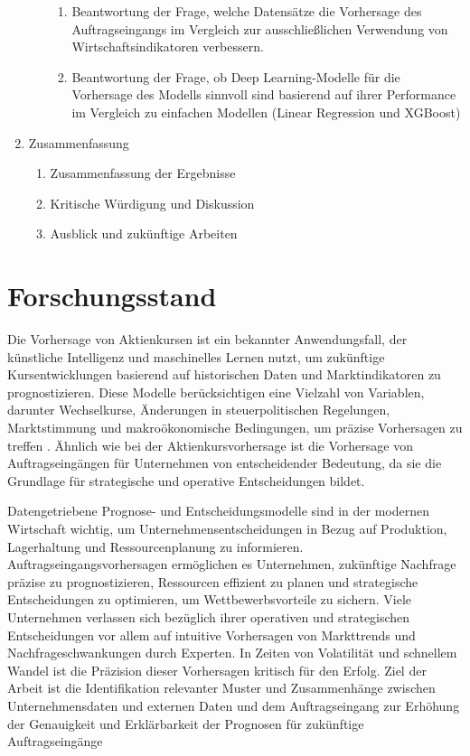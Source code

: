 \documentclass[lettersize,journal]{IEEEtran}
\begin{document}
\begin{enumerate}
\begin{enumerate}
\begin{enumerate}
      \item Beantwortung der Frage, welche Datensätze die Vorhersage des Auftragseingangs im Vergleich zur ausschließlichen Verwendung von Wirtschaftsindikatoren verbessern.
      \item Beantwortung der Frage, ob Deep Learning-Modelle für die Vorhersage des Modells sinnvoll sind basierend auf ihrer Performance im Vergleich zu einfachen Modellen (Linear Regression und XGBoost)
    \end{enumerate}
  \end{enumerate}
  \item Zusammenfassung
  \begin{enumerate}
    \item Zusammenfassung der Ergebnisse
    \item Kritische Würdigung und Diskussion
    \item Ausblick und zukünftige Arbeiten
  \end{enumerate}
\end{enumerate}



\section{Forschungsstand}
Die Vorhersage von Aktienkursen ist ein bekannter Anwendungsfall, der künstliche Intelligenz und maschinelles Lernen nutzt, um zukünftige Kursentwicklungen basierend auf historischen Daten und Marktindikatoren zu prognostizieren. Diese Modelle berücksichtigen eine Vielzahl von Variablen, darunter Wechselkurse, Änderungen in steuerpolitischen Regelungen, Marktstimmung und makroökonomische Bedingungen, um präzise Vorhersagen zu treffen \cite{mo2024backgroundawaremultisourcefusionfinancial}. Ähnlich wie bei der Aktienkursvorhersage ist die Vorhersage von Auftragseingängen für Unternehmen von entscheidender Bedeutung, da sie die Grundlage für strategische und operative Entscheidungen bildet.

Datengetriebene Prognose- und Entscheidungsmodelle sind in der modernen Wirtschaft wichtig, um Unternehmensentscheidungen in Bezug auf Produktion, Lagerhaltung und Ressourcenplanung zu informieren. Auftragseingangsvorhersagen ermöglichen es Unternehmen, zukünftige Nachfrage präzise zu prognostizieren, Ressourcen effizient zu planen und strategische Entscheidungen zu optimieren, um Wettbewerbsvorteile zu sichern. 
Viele Unternehmen verlassen sich bezüglich ihrer operativen und strategischen Entscheidungen vor allem auf intuitive Vorhersagen von Markttrends und Nachfrageschwankungen durch Experten. In Zeiten von Volatilität und schnellem Wandel ist die Präzision dieser Vorhersagen kritisch für den Erfolg.
Ziel der Arbeit ist die Identifikation relevanter Muster und Zusammenhänge zwischen Unternehmensdaten und externen Daten und dem Auftragseingang zur Erhöhung der Genauigkeit und Erklärbarkeit der Prognosen für zukünftige Auftragseingänge
\end{document}
